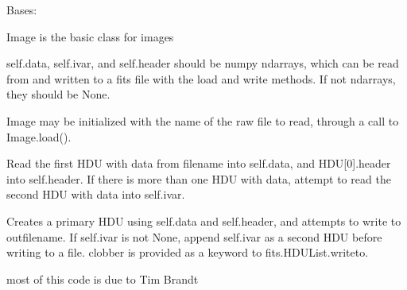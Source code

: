 \documentclass[letterpaper,10pt,english]{sphinxmanual}
\begin{document}
\begin{fulllineitems}
\label{tools:tools.image.Image}
Bases: \href{https://docs.python.org/2/library/functions.html\#object}{}

Image is the basic class for images

self.data, self.ivar, and self.header should be numpy ndarrays, 
which can be read from and written to a fits file with the load 
and write methods.  If not ndarrays, they should be None.

Image may be initialized with the name of the raw file to read,
through a call to Image.load().

\begin{fulllineitems}
\label{tools:tools.image.Image.load}
Read the first HDU with data from filename into self.data, and
HDU{[}0{]}.header into self.header.  If there is more than one HDU
with data, attempt to read the second HDU with data into
self.ivar.

\end{fulllineitems}


\begin{fulllineitems}
\label{tools:tools.image.Image.write}
Creates a primary HDU using self.data and self.header, and
attempts to write to outfilename.  If self.ivar is not None,
append self.ivar as a second HDU before writing to a file.       
clobber is provided as a keyword to fits.HDUList.writeto.

\end{fulllineitems}


\end{fulllineitems}


\begin{fulllineitems}
\label{tools:tools.image.log}
most of this code is due to Tim Brandt

\end{fulllineitems}
\end{document}
